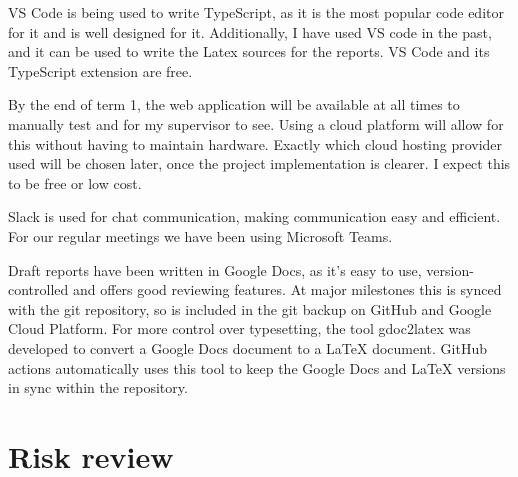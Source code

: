 \documentclass[12pt]{article}
\begin{document}
VS Code is being used to write TypeScript, as it is the most popular code editor for it and is well designed for it. Additionally, I have used VS code in the past, and it can be used to write the Latex sources for the reports. VS Code and its TypeScript extension are free.

By the end of term 1, the web application will be available at all times to manually test and for my supervisor to see. Using a cloud platform will allow for this without having to maintain hardware. Exactly which cloud hosting provider used will be chosen later, once the project implementation is clearer. I expect this to be free or low cost.

Slack is used for chat communication, making communication easy and efficient. For our regular meetings we have been using Microsoft Teams.

Draft reports have been written in Google Docs, as it’s easy to use, version-controlled and offers good reviewing features. At major milestones this is synced with the git repository, so is included in the git backup on GitHub and Google Cloud Platform. For more control over typesetting, the tool gdoc2latex\cite{ref15} was developed to convert a Google Docs document to a LaTeX document. GitHub actions automatically uses this tool to keep the Google Docs and LaTeX versions in sync within the repository.

\section{Risk review}
\end{document}
